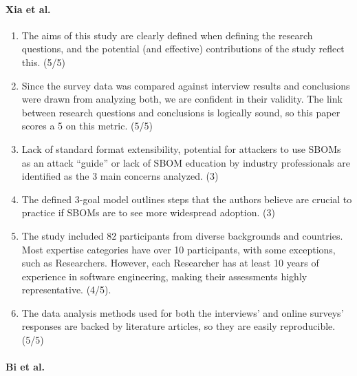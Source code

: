 \paragraph{Xia et al. \cite{article:sbom-study}}

\begin{enumerate}
    \item The aims of this study are clearly defined when defining the research questions, and the potential (and effective) contributions of the study reflect this. (5/5)
    \item Since the survey data was compared against interview results and conclusions were drawn from analyzing both, we are confident in their validity. The link between research questions and conclusions is logically sound, so this paper scores a 5 on this metric. (5/5)
    \item Lack of standard format extensibility, potential for attackers to use SBOMs as an attack \enquote{guide} or lack of SBOM education by industry professionals are identified as the 3 main concerns analyzed. (3)
    \item The defined 3-goal model outlines steps that the authors believe are crucial to practice if SBOMs are to see more widespread adoption. (3)
    \item The study included 82 participants from diverse backgrounds and countries. Most expertise categories have over 10 participants, with some exceptions, such as Researchers. However, each Researcher has at least 10 years of experience in software engineering, making their assessments highly representative. (4/5).
    \item The data analysis methods used for both the interviews' and online surveys' responses are backed by literature articles, so they are easily reproducible. (5/5)
\end{enumerate}

\paragraph{Bi et al. \cite{article:sboms-issues-solutions}}

